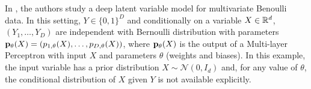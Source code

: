 \documentclass[english,graybox,envcountchap,envcountsame,sectrefs,shortlabels]{svmono}
\theoremstyle{style}
\begin{document}
\begin{example}
In \cite{kingma2013auto}, the authors study a deep latent variable model for multivariate Benoulli data. In this setting, $Y\in\{0,1\}^D$ and conditionally on a variable $X\in\mathbb{R}^d$, $(Y_1,\ldots,Y_D)$ are independent with Bernoulli distribution with parameters ${\bf p}_\theta(X) = (p_{1,\theta}(X),\ldots, p_{D,\theta}(X))$, where ${\bf p}_\theta(X) $ is the output of a Multi-layer Perceptron with input $X$ and parameters $\theta$ (weights and biases). In this example, the input variable has a prior distribution $X\sim \mathcal{N}(0,I_d)$ and, for any value of $\theta$, the conditional distribution of $X$ given $Y$ is not available explicitly.
\end{example}

 
\end{document}
